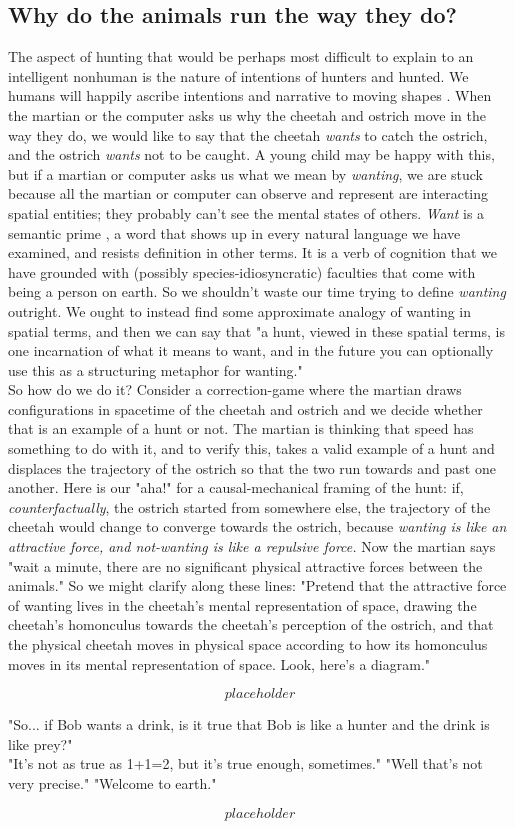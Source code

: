 \subsection{Why do the animals run the way they do?}

The aspect of hunting that would be perhaps most difficult to explain to an intelligent nonhuman is the nature of intentions of hunters and hunted. We humans will happily ascribe intentions and narrative to moving shapes \citep{}. When the martian or the computer asks us why the cheetah and ostrich move in the way they do, we would like to say that the cheetah \emph{wants} to catch the ostrich, and the ostrich \emph{wants} not to be caught. A young child may be happy with this, but if a martian or computer asks us what we mean by \emph{wanting}, we are stuck because all the martian or computer can observe and represent are interacting spatial entities; they probably can't see the mental states of others. \emph{Want} is a semantic prime \citep{}, a word that shows up in every natural language we have examined, and resists definition in other terms. It is a verb of cognition that we have grounded with (possibly species-idiosyncratic) faculties that come with being a person on earth. So we shouldn't waste our time trying to define \emph{wanting} outright. We ought to instead find some approximate analogy of wanting in spatial terms, and then we can say that "a hunt, viewed in these spatial terms, is one incarnation of what it means to want, and in the future you can optionally use this as a structuring metaphor for wanting."\\

So how do we do it? Consider a correction-game where the martian draws configurations in spacetime of the cheetah and ostrich and we decide whether that is an example of a hunt or not. The martian is thinking that speed has something to do with it, and to verify this, takes a valid example of a hunt and displaces the trajectory of the ostrich so that the two run towards and past one another. Here is our "aha!" for a causal-mechanical framing of the hunt: if, \emph{counterfactually}, the ostrich started from somewhere else, the trajectory of the cheetah would change to converge towards the ostrich, because \emph{wanting is like an attractive force, and not-wanting is like a repulsive force.} Now the martian says "wait a minute, there are no significant physical attractive forces between the animals." So we might clarify along these lines: "Pretend that the attractive force of wanting lives in the cheetah's mental representation of space, drawing the cheetah's homonculus towards the cheetah's perception of the ostrich, and that the physical cheetah moves in physical space according to how its homonculus moves in its mental representation of space. Look, here's a diagram."

\[placeholder\]

"So... if Bob wants a drink, is it true that Bob is like a hunter and the drink is like prey?"\\
"It's not as true as 1+1=2, but it's true enough, sometimes."
"Well that's not very precise."
"Welcome to earth."

\[placeholder\]





 